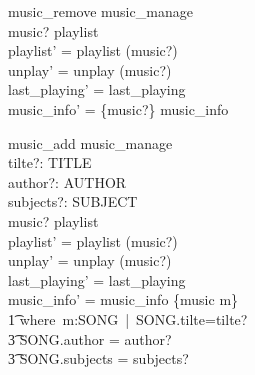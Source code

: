 \documentclass[14pt]{article}
\numberwithin{figure}{subsection}
\begin{document}
\begin{minipage}[t]{0.5\linewidth}
    \begin{schema}{music\_remove}
        music\_manage\\
        \where
        music? \in playlist\\
        playlist' = playlist \setminus (music?)\\
        unplay' = unplay \setminus (music?)\\
        last\_playing' = last\_playing\\
        music\_info' = \{music?\} \ndres music\_info
    \end{schema}
\end{minipage}
\hfill
\begin{minipage}[t]{0.5\linewidth}
    \begin{schema}{music\_add}
        music\_manage\\
        tilte?: TITLE\\
        author?: \finset AUTHOR\\
        subjects?: \finset SUBJECT\\
        \where
        music? \not\in playlist\\
        playlist' = playlist \cup (music?)\\
        unplay' = unplay \cup (music?)\\
        last\_playing' = last\_playing\\
        music\_info' = music\_info \oplus \{music \mapsto m\}\\
        \t1 where\ m:SONG\ |\ SONG.tilte=tilte?\\
        \t3 \quad SONG.author = author?\\
        \t3 \quad SONG.subjects = subjects?
    \end{schema}

\end{minipage}
\end{document}
